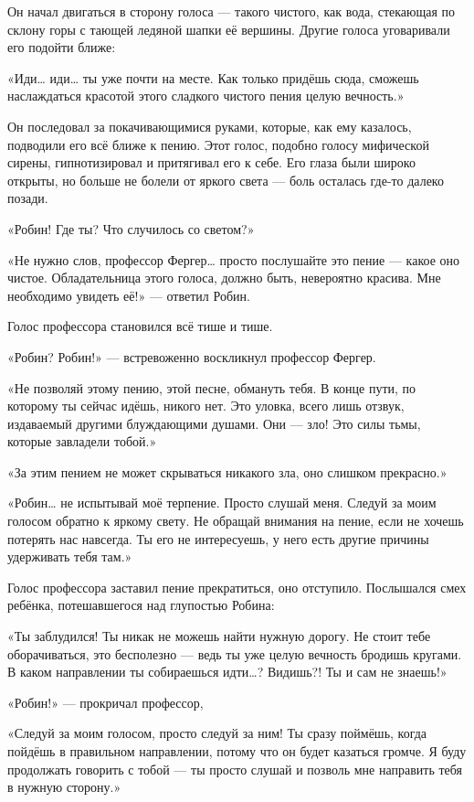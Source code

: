\documentclass[a5paper, 9pt,
final, openany, twoside=true]{memoir}
\begin{document}
Он начал двигаться в сторону голоса — такого чистого, как вода, стекающая по склону горы с тающей ледяной шапки её вершины. Другие голоса уговаривали его подойти ближе:

«Иди… иди… ты уже почти на месте. Как только придёшь сюда, сможешь наслаждаться красотой этого сладкого чистого пения целую вечность.»

Он последовал за покачивающимися руками, которые, как ему казалось, подводили его всё ближе к пению. Этот голос, подобно голосу мифической сирены, гипнотизировал и притягивал его к себе. Его глаза были широко открыты, но больше не болели от яркого света — боль осталась где-то далеко позади.

«Робин! Где ты? Что случилось со светом?»

«Не нужно слов, профессор Фергер… просто послушайте это пение — какое оно чистое. Обладательница этого голоса, должно быть, невероятно красива. Мне необходимо увидеть её!» — ответил Робин.

Голос профессора становился всё тише и тише.

«Робин? Робин!» — встревоженно воскликнул профессор Фергер.

«Не позволяй этому пению, этой песне, обмануть тебя. В конце пути, по которому ты сейчас идёшь, никого нет. Это уловка, всего лишь отзвук, издаваемый другими блуждающими душами. Они — зло! Это силы тьмы, которые завладели тобой.»

«За этим пением не может скрываться никакого зла, оно слишком прекрасно.»

«Робин… не испытывай моё терпение. Просто слушай меня. Следуй за моим голосом обратно к яркому свету. Не обращай внимания на пение, если не хочешь потерять нас навсегда. Ты его не интересуешь, у него есть другие причины удерживать тебя там.»

Голос профессора заставил пение прекратиться, оно отступило. Послышался смех ребёнка, потешавшегося над глупостью Робина:

«Ты заблудился! Ты никак не можешь найти нужную дорогу. Не стоит тебе оборачиваться, это бесполезно — ведь ты уже целую вечность бродишь кругами. В каком направлении ты собираешься идти…? Видишь?! Ты и сам не знаешь!»

«Робин!» — прокричал профессор,

«Следуй за моим голосом, просто следуй за ним! Ты сразу поймёшь, когда пойдёшь в правильном направлении, потому что он будет казаться громче. Я буду продолжать говорить с тобой — ты просто слушай и позволь мне направить тебя в нужную сторону.»
\end{document}
